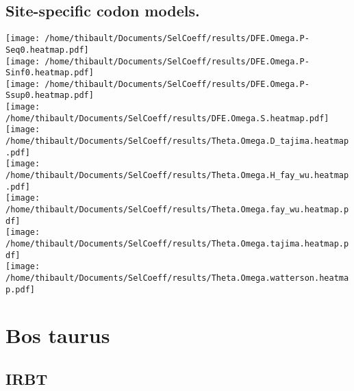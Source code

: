 \subsection{Site-specific codon models.} 
\begin{center}
\texttt{[image: /home/thibault/Documents/SelCoeff/results/DFE.Omega.P-Seq0.heatmap.pdf]} \\
\texttt{[image: /home/thibault/Documents/SelCoeff/results/DFE.Omega.P-Sinf0.heatmap.pdf]} \\
\texttt{[image: /home/thibault/Documents/SelCoeff/results/DFE.Omega.P-Ssup0.heatmap.pdf]} \\
\texttt{[image: /home/thibault/Documents/SelCoeff/results/DFE.Omega.S.heatmap.pdf]} \\
\texttt{[image: /home/thibault/Documents/SelCoeff/results/Theta.Omega.D\_tajima.heatmap.pdf]} \\
\texttt{[image: /home/thibault/Documents/SelCoeff/results/Theta.Omega.H\_fay\_wu.heatmap.pdf]} \\
\texttt{[image: /home/thibault/Documents/SelCoeff/results/Theta.Omega.fay\_wu.heatmap.pdf]} \\
\texttt{[image: /home/thibault/Documents/SelCoeff/results/Theta.Omega.tajima.heatmap.pdf]} \\
\texttt{[image: /home/thibault/Documents/SelCoeff/results/Theta.Omega.watterson.heatmap.pdf]} \\
\end{center}
\section{Bos taurus} 
 
\subsection{IRBT} 
 
